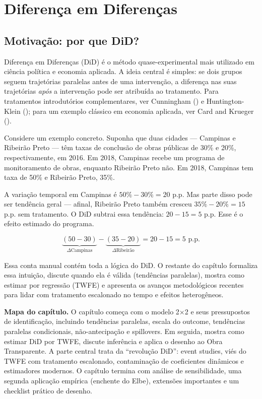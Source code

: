 \documentclass[
]{article}
\begin{document}
\section{Diferença em Diferenças}\label{diferenuxe7a-em-diferenuxe7as}

\subsection{Motivação: por que DiD?}\label{motivauxe7uxe3o-por-que-did}

Diferença em Diferenças (DiD) é o método quase-experimental mais utilizado em ciência política e economia aplicada. A ideia central é simples: se dois grupos seguem trajetórias paralelas antes de uma intervenção, a diferença nas suas trajetórias \emph{após} a intervenção pode ser atribuída ao tratamento. Para tratamentos introdutórios complementares, ver Cunningham () e Huntington-Klein (); para um exemplo clássico em economia aplicada, ver Card and Krueger ().

Considere um exemplo concreto. Suponha que duas cidades --- Campinas e Ribeirão Preto --- têm taxas de conclusão de obras públicas de 30\% e 20\%, respectivamente, em 2016. Em 2018, Campinas recebe um programa de monitoramento de obras, enquanto Ribeirão Preto não. Em 2018, Campinas tem taxa de 50\% e Ribeirão Preto, 35\%.

A variação temporal em Campinas é \(50\% - 30\% = 20\) p.p. Mas parte disso pode ser tendência geral --- afinal, Ribeirão Preto também cresceu \(35\% - 20\% = 15\) p.p. sem tratamento. O DiD subtrai essa tendência: \(20 - 15 = 5\) p.p. Esse é o efeito estimado do programa.

\[
\underbrace{(50 - 30)}_{\Delta \text{Campinas}} - \underbrace{(35 - 20)}_{\Delta \text{Ribeirão}} = 20 - 15 = 5 \text{ p.p.}
\]

Essa conta manual contém toda a lógica do DiD. O restante do capítulo formaliza essa intuição, discute quando ela é válida (tendências paralelas), mostra como estimar por regressão (TWFE) e apresenta os avanços metodológicos recentes para lidar com tratamento escalonado no tempo e efeitos heterogêneos.

\textbf{Mapa do capítulo.} O capítulo começa com o modelo 2×2 e seus pressupostos de identificação, incluindo tendências paralelas, escala do outcome, tendências paralelas condicionais, não-antecipação e spillovers. Em seguida, mostra como estimar DiD por TWFE, discute inferência e aplica o desenho ao Obra Transparente. A parte central trata da ``revolução DiD'': event studies, viés do TWFE com tratamento escalonado, contaminação de coeficientes dinâmicos e estimadores modernos. O capítulo termina com análise de sensibilidade, uma segunda aplicação empírica (enchente do Elbe), extensões importantes e um checklist prático de desenho.
\end{document}
